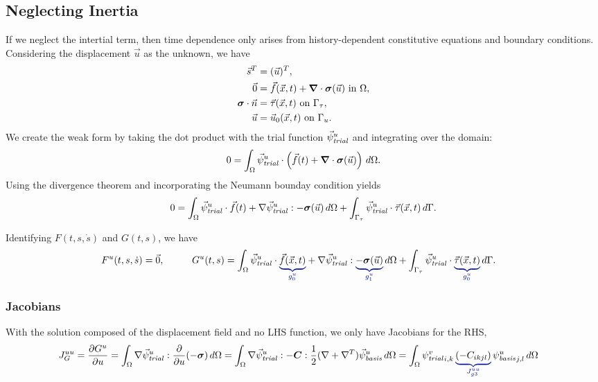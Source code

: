 \subsection{Neglecting Inertia}

If we neglect the intertial term, then time dependence only arises
from history-dependent constitutive equations and boundary
conditions. Considering the displacement $\vec{u}$ as the unknown, we
have
\begin{align}
  \vec{s}^T &= (\vec{u})^T, \\
%
  \vec{0} &= \vec{f}(\vec{x},t) + \tensor{\nabla} \cdot \tensor{\sigma}(\vec{u}) \text{ in }
\Omega, \\
  \tensor{\sigma} \cdot \vec{n} &= \vec{\tau}(\vec{x},t) \text{ on }\Gamma_\tau, \\
  \vec{u} &= \vec{u}_0(\vec{x},t) \text{ on }\Gamma_u.
\end{align}
We create the weak form by taking the dot product with the trial
function $\trialvec[u]$ and integrating over the domain:
\begin{equation}
  0 = \int_\Omega \trialvec[u] \cdot \left( \vec{f}(t) + \tensor{\nabla} \cdot \tensor{\sigma}
(\vec{u})  \right) 
\, d\Omega.
\end{equation}
Using the divergence theorem and incorporating the Neumann bounday
condition yields
\begin{equation}
  0 = \int_\Omega \trialvec[u] \cdot \vec{f}(t) + \nabla \trialvec[u] : -\tensor{\sigma}
(\vec{u}) \, d\Omega + 
\int_{\Gamma_\tau} \trialvec[u] \cdot \vec{\tau}(\vec{x},t) \, d\Gamma.
\end{equation}

Identifying $F(t,s,\dot{s})$ and $G(t,s)$, we have
\begin{alignat}{2}
  F^u(t,s,\dot{s}) &= \vec{0},
  & \qquad
  G^u(t,s) &= \int_\Omega \trialvec[u] \cdot \eqnannotate{\vec{f}(\vec{x},t)}{g_0^u} + \nabla 
\trialvec[u] : 
\eqnannotate{-\tensor{\sigma}(\vec{u})}{g_1^u} \, d\Omega + \int_{\Gamma_\tau} \trialvec[u] 
\cdot 
\eqnannotate{\vec{\tau}(\vec{x},t)}{g_0^u} \, d\Gamma.
\end{alignat}


\subsubsection{Jacobians}

With the solution composed of the displacement field and no LHS function, we only have 
Jacobians for the RHS,
\begin{align}
  J_G^{uu} &= \frac{\partial G^u}{\partial u} = \int_\Omega \nabla \trialvec[u] : 
\frac{\partial}{\partial u}(-
\tensor{\sigma}) \, d\Omega 
  = \int_\Omega \nabla \trialvec[u] : -\tensor{C} : \frac{1}{2}(\nabla + \nabla^T)\basisvec[u] 
\, d\Omega 
  = \int_\Omega \trialscalar[v]_{i,k} \, \eqnannotate{\left( -C_{ikjl} \right)}{J_{g3}^{uu}}  
\, 
\basisscalar[u]_{j,l}\, d\Omega
\end{align}

